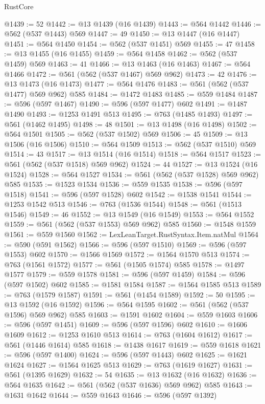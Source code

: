 \begin{lexlean}{RustCore}
\begin{coremodule}
@1439 := 52
@1442 := @13 @1439 (@16 @1439)
@1443 := @564 @1442
@1446 := @562 (@537 @1443) @569
@1447 := 49
@1450 := @13 @1447 (@16 @1447)
@1451 := @564 @1450
@1454 := @562 (@537 @1451) @569
@1455 := 47
@1458 := @13 @1455 (@16 @1455)
@1459 := @564 @1458
@1462 := @562 (@537 @1459) @569
@1463 := 41
@1466 := @13 @1463 (@16 @1463)
@1467 := @564 @1466
@1472 := @561 (@562 (@537 @1467) @569 @962)
@1473 := 42
@1476 := @13 @1473 (@16 @1473)
@1477 := @564 @1476
@1483 := @561 (@562 (@537 @1477) @569 @962) @585
@1484 := @1472 @1483
@1485 := @559 @1484
@1487 := @596 (@597 @1467)
@1490 := @596 (@597 @1477) @602
@1491 := @1487 @1490
@1493 := @1253 @1491 @513
@1495 := @763 (@1485 @1493)
@1497 := @561 (@1462 @1495)
@1498 := 48
@1501 := @13 @1498 (@16 @1498)
@1502 := @564 @1501
@1505 := @562 (@537 @1502) @569
@1506 := 45
@1509 := @13 @1506 (@16 @1506)
@1510 := @564 @1509
@1513 := @562 (@537 @1510) @569
@1514 := 43
@1517 := @13 @1514 (@16 @1514)
@1518 := @564 @1517
@1523 := @561 (@562 (@537 @1518) @569 @962)
@1524 := 44
@1527 := @13 @1524 (@16 @1524)
@1528 := @564 @1527
@1534 := @561 (@562 (@537 @1528) @569 @962) @585
@1535 := @1523 @1534
@1536 := @559 @1535
@1538 := @596 (@597 @1518)
@1541 := @596 (@597 @1528) @602
@1542 := @1538 @1541
@1544 := @1253 @1542 @513
@1546 := @763 (@1536 @1544)
@1548 := @561 (@1513 @1546)
@1549 := 46
@1552 := @13 @1549 (@16 @1549)
@1553 := @564 @1552
@1559 := @561 (@562 (@537 @1553) @569 @962) @585
@1560 := @1548 @1559
@1561 := @559 @1560
@1562 := LexLeanTarget.RustSyntax.Item.natMul
@1564 := @590 (@591 @1562)
@1566 := @596 (@597 @1510)
@1569 := @596 (@597 @1553) @602
@1570 := @1566 @1569
@1572 := @1564 @1570 @513
@1574 := @763 (@1561 @1572)
@1577 := @561 (@1505 @1574) @585
@1578 := @1497 @1577
@1579 := @559 @1578
@1581 := @596 (@597 @1459)
@1584 := @596 (@597 @1502) @602
@1585 := @1581 @1584
@1587 := @1564 @1585 @513
@1589 := @763 (@1579 @1587)
@1591 := @561 (@1454 @1589)
@1592 := 50
@1595 := @13 @1592 (@16 @1592)
@1596 := @564 @1595
@1602 := @561 (@562 (@537 @1596) @569 @962) @585
@1603 := @1591 @1602
@1604 := @559 @1603
@1606 := @596 (@597 @1451)
@1609 := @596 (@597 @1596) @602
@1610 := @1606 @1609
@1612 := @1253 @1610 @513
@1614 := @763 (@1604 @1612)
@1617 := @561 (@1446 @1614) @585
@1618 := @1438 @1617
@1619 := @559 @1618
@1621 := @596 (@597 @1400)
@1624 := @596 (@597 @1443) @602
@1625 := @1621 @1624
@1627 := @1564 @1625 @513
@1629 := @763 (@1619 @1627)
@1631 := @561 (@1395 @1629)
@1632 := 54
@1635 := @13 @1632 (@16 @1632)
@1636 := @564 @1635
@1642 := @561 (@562 (@537 @1636) @569 @962) @585
@1643 := @1631 @1642
@1644 := @559 @1643
@1646 := @596 (@597 @1392)

\end{coremodule}
\end{lexlean}
